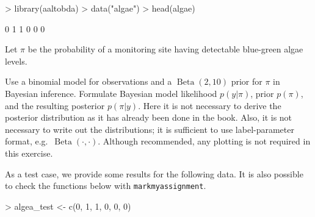 \documentclass[a4paper,11pt]{article}
\DeclareMathOperator{\Beta}{Beta}
\begin{document}
\begin{Schunk}
\begin{Sinput}
> library(aaltobda)
> data("algae")
> head(algae)
\end{Sinput}
\begin{Soutput}
[1] 0 1 1 0 0 0
\end{Soutput}
\end{Schunk}

Let $\pi$ be the probability of a monitoring site having detectable
blue-green algae levels.

Use a binomial model for observations and a $\Beta(2,10)$ prior
for $\pi$ in Bayesian inference. Formulate Bayesian model likelihood
$p(y|\pi)$, prior $p(\pi)$, and the resulting posterior $p(\pi|y)$.
Here it is not necessary to derive the posterior distribution as it has already been done in the book.
Also, it is not necessary to write out the distributions; it is sufficient to use label-parameter format, e.g.\ $\Beta(\cdot,\cdot)$. Although recommended, any plotting is not required in this exercise.

As a test case, we provide some results for the following data. It is also possible to check the functions below with \texttt{markmyassignment}.

\begin{Schunk}
\begin{Sinput}
> algea_test <- c(0, 1, 1, 0, 0, 0)
\end{Sinput}
\end{Schunk}

\end{document}
